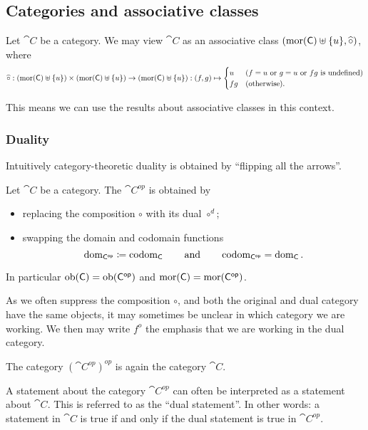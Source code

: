 \subsection{Categories and associative classes}
\begin{lemma}
Let $\cat{C}$ be a category. We may view $\cat{C}$ as an associative class $\left( \operatorname{mor}(\mathsf{C})\uplus \{u\}, \widehat{\circ} \right)$, where
\[ \widehat{\circ}: (\operatorname{mor}(\mathsf{C})\uplus \{u\}) \times (\operatorname{mor}(\mathsf{C})\uplus \{u\}) \to (\operatorname{mor}(\mathsf{C})\uplus \{u\}): (f,g) \mapsto \begin{cases}
u & (\text{$f=u$ or $g=u$ or $fg$ is undefined}) \\
fg & (\text{otherwise}).
\end{cases} \]
\end{lemma}
This means we can use the results about associative classes in this context.

\subsubsection{Duality}
Intuitively category-theoretic duality is obtained by ``flipping all the arrows''.
\begin{definition}
Let $\cat{C}$ be a category. The  $\cat{C^{op}}$ is obtained by
\begin{itemize}
\item replacing the composition $\circ$ with its dual $\circ^d$;
\item swapping the domain and codomain functions
\[ \operatorname{dom}_{\mathsf{C^{op}}} \coloneqq \operatorname{codom}_{\mathsf{C}} \qquad \text{and} \qquad \operatorname{codom}_{\mathsf{C^{op}}} = \operatorname{dom}_{\mathsf{C}}.  \]
\end{itemize}
In particular $\operatorname{ob}(\mathsf{C}) = \operatorname{ob}(\mathsf{C^{op}})$ and $\operatorname{mor}(\mathsf{C}) = \operatorname{mor}(\mathsf{C^{op}})$.
\end{definition}
As we often suppress the composition $\circ$, and both the original and dual category have the same objects, it may sometimes be unclear in which category we are working. We then may write $f^o$ the emphasis that we are working in the dual category.

\begin{lemma}
The category $(\cat{C}^{op})^{op}$ is again the category $\cat{C}$.
\end{lemma}


A statement about the category $\cat{C^{op}}$ can often be interpreted as a statement about $\cat{C}$. This is referred to as the ``dual statement''. In other words: a statement in $\cat{C}$ is true if and only if the dual statement is true in $\cat{C^{op}}$.

